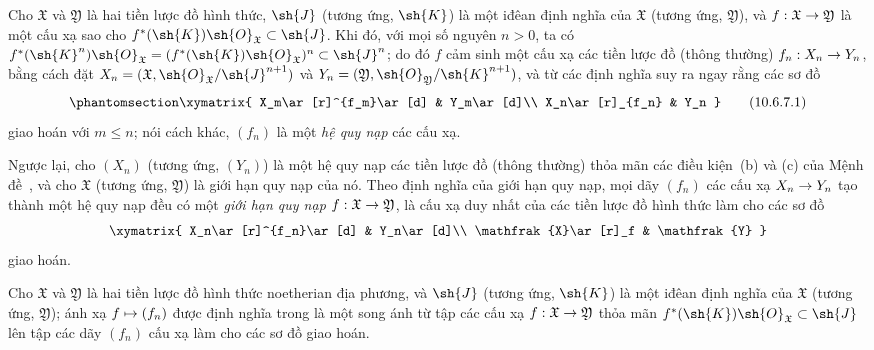 \documentclass[oneside]{amsart}
\makeatletter
\renewcommand{\leq}{\leqslant}
\newcommand{\ega@arrow}[2]{\mathchoice{#1}{#2}{#2}{#2}}
\let\ega@shortmapsto\mapsto
\renewcommand{\to}{\ega@arrow{\longrightarrow}{\rightarrow}}
\renewcommand{\mapsto}{\ega@arrow{\longmapsto}{\ega@shortmapsto}}
\newcommand{\oldpage}[2][]{{\marginnote{\normalfont\textbf{#1}~|~#2}}\ignorespaces}
\let\EGAOriginalLabel\label
\renewcommand{\label}[1]{\phantomsection\EGAOriginalLabel{#1}}
\makeatother
\begin{document}
\begin{env}[10.6.7]
\label{I.10.6.7}
Cho $\mathfrak{X}$ và $\mathfrak{Y}$ là hai tiền lược đồ hình thức, $\sh{J}$ (tương ứng, $\sh{K}$) là một iđêan định nghĩa của $\mathfrak{X}$ (tương ứng, $\mathfrak{Y}$), và $f:\mathfrak{X}\to\mathfrak{Y}$ là một cấu xạ sao cho $f^*(\sh{K})\sh{O}_\mathfrak{X}\subset\sh{J}$.
Khi đó, với mọi số nguyên $n>0$, ta có $f^*(\sh{K}^n)\sh{O}_\mathfrak{X}=(f^*(\sh{K})\sh{O}_\mathfrak{X})^n\subset\sh{J}^n$; do đó $f$ cảm sinh  một cấu xạ các tiền lược đồ (thông thường) $f_n:X_n\to Y_n$, bằng cách đặt $X_n=(\mathfrak{X},\sh{O}_\mathfrak{X}/\sh{J}^{n+1})$ và $Y_n=(\mathfrak{Y},\sh{O}_\mathfrak{Y}/\sh{K}^{n+1})$, và từ các định nghĩa suy ra ngay rằng các sơ đồ
\[
\label{I.10.6.7.1}
  \xymatrix{
    X_m\ar[r]^{f_m}\ar[d] &
    Y_m\ar[d]\\
    X_n\ar[r]_{f_n} &
    Y_n
  }
  \tag{10.6.7.1}
\]
\oldpage[I]{192}
giao hoán với $m\leq n$; nói cách khác, $(f_n)$ là một \emph{hệ quy nạp} các cấu xạ.
\end{env}

\begin{env}[10.6.8]
\label{I.10.6.8}
Ngược lại, cho $(X_n)$ (tương ứng, $(Y_n)$) là một hệ quy nạp các tiền lược đồ (thông thường) thỏa mãn các điều kiện~(b) và (c) của Mệnh đề~, và cho $\mathfrak{X}$ (tương ứng, $\mathfrak{Y}$) là giới hạn quy nạp của nó.
Theo định nghĩa của giới hạn quy nạp, mọi dãy $(f_n)$ các cấu xạ $X_n\to Y_n$ tạo thành một hệ quy nạp đều có một \emph{giới hạn quy nạp $f:\mathfrak{X}\to\mathfrak{Y}$}, là cấu xạ duy nhất của các tiền lược đồ hình thức làm cho các sơ đồ
\[
  \xymatrix{
    X_n\ar[r]^{f_n}\ar[d] &
    Y_n\ar[d]\\
    \mathfrak{X}\ar[r]_f &
    \mathfrak{Y}
  }
\]
giao hoán.
\end{env}

\begin{proposition}[10.6.9]
\label{I.10.6.9}
Cho $\mathfrak{X}$ và $\mathfrak{Y}$ là hai tiền lược đồ hình thức noetherian địa phương, và $\sh{J}$ (tương ứng, $\sh{K}$) là một iđêan định nghĩa của $\mathfrak{X}$ (tương ứng, $\mathfrak{Y}$); ánh xạ $f\mapsto(f_n)$ được định nghĩa trong  là một song ánh từ tập các cấu xạ $f:\mathfrak{X}\to\mathfrak{Y}$ thỏa mãn $f^*(\sh{K})\sh{O}_\mathfrak{X}\subset\sh{J}$ lên tập các dãy $(f_n)$ cấu xạ làm cho các sơ đồ  giao hoán.
\end{proposition}
\end{document}
